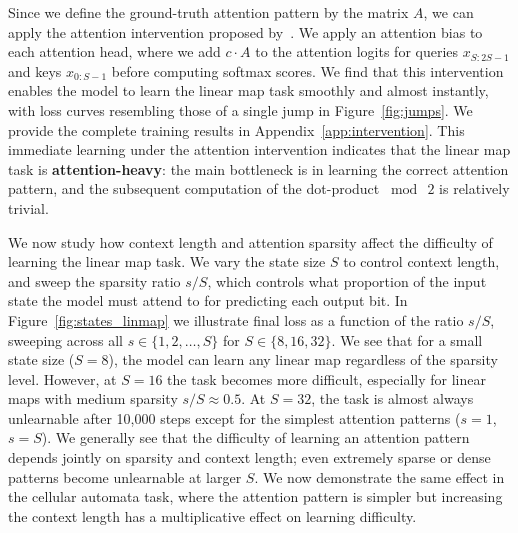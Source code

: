 \documentclass{article}
\newcommand{\xxcomment}[4]{}
\newcommand{\vatsal}[1]{}
\newcommand{\xxcomment}[4]{\textcolor{#1}{[$^{\textsc{#2}}_{\textsc{#3}}$ #4]}}
\newcommand{\vatsal}[1]{\xxcomment{pinkypink}{V}{B}{#1}}
\begin{document}

Since we define the ground-truth attention pattern by the matrix $A$, we can apply the attention intervention proposed by~\citet{gopalani2025happenslossplateauunderstanding}. We apply an attention bias to each attention head, where we add $c\cdot A$ to the attention logits for queries $x_{S:2S-1}$ and keys $x_{0:S-1}$ before computing softmax scores. We find that this intervention enables the model to learn the linear map task smoothly and almost instantly, with loss curves resembling those of a single jump in Figure~\ref{fig:jumps}. We provide the complete training results in Appendix~\ref{app:intervention}. This immediate learning under the attention intervention indicates that the linear map task is \textbf{attention-heavy}: the main bottleneck is in learning the correct attention pattern, and the subsequent computation of the dot-product $\bmod\ 2$ is relatively trivial.

We now study how context length and attention sparsity affect the difficulty of learning the linear map task. We vary the state size $S$ to control context length, and sweep the sparsity ratio $s/S$, which controls what proportion of the input state the model must attend to for predicting each output bit. In Figure~\ref{fig:states_linmap} we illustrate final loss as a function of the ratio $s/S$, sweeping across all $s\in\{1,2,\dots, S\}$ for $S\in\{8, 16, 32\}$. We see that for a small state size ($S=8$), the model can learn any linear map regardless of the sparsity level. However, at $S=16$ the task becomes more difficult, especially for linear maps with medium sparsity $s/S\approx0.5$. At $S=32$, the task is almost always unlearnable after 10,000 steps except for the simplest attention patterns ($s=1$, $s=S$). We generally see that the difficulty of learning an attention pattern depends jointly on sparsity and context length; even extremely sparse or dense patterns become unlearnable at larger $S$. We now demonstrate the same effect in the cellular automata task, where the attention pattern is simpler but increasing the context length has a multiplicative effect on learning difficulty.
\end{document}
